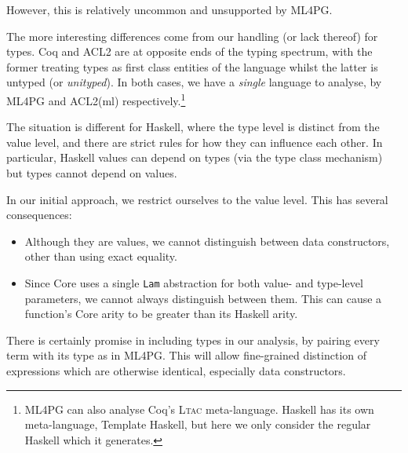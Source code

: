 However, this is relatively uncommon and unsupported by ML4PG.

The more interesting differences come from our handling (or lack thereof) for types. Coq and ACL2 are at opposite ends of the typing spectrum, with the former treating types as first class entities of the language whilst the latter is untyped (or \emph{unityped}). In both cases, we have a \emph{single} language to analyse, by ML4PG and ACL2(ml) respectively.\footnote{ML4PG can also analyse Coq's \textsc{Ltac} meta-language. Haskell has its own meta-language, Template Haskell, but here we only consider the regular Haskell which it generates.}

The situation is different for Haskell, where the type level is distinct from the value level, and there are strict rules for how they can influence each other. In particular, Haskell values can depend on types (via the type class mechanism) but types cannot depend on values.

In our initial approach, we restrict ourselves to the value level. This has several consequences:

\begin{itemize}
  \item Although they are values, we cannot distinguish between data constructors, other than using exact equality.
  \item Since Core uses a single \texttt{Lam} abstraction for both value- and type-level parameters, we cannot always distinguish between them. This can cause a function's Core arity to be greater than its Haskell arity.
\end{itemize}

There is certainly promise in including types in our analysis, by pairing every term with its type as in ML4PG. This will allow fine-grained distinction of expressions which are otherwise identical, especially data constructors.
